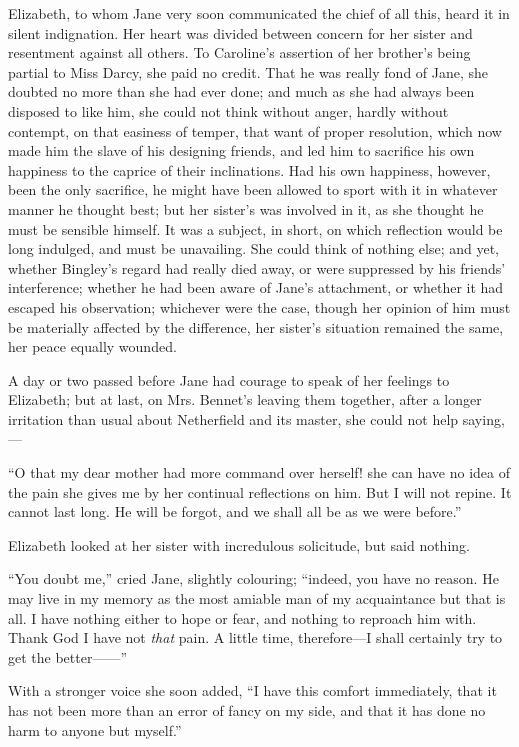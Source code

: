 Elizabeth, to whom Jane very soon communicated the chief of all this, heard it in silent indignation. Her heart was divided between concern for her sister and resentment against all others. To Caroline's assertion of her brother's being partial to Miss Darcy, she paid no credit. That he was really fond of Jane, she doubted no more than she had ever done; and much as she had always been disposed to like him, she could not think without anger, hardly without contempt, on that easiness of temper, that want of proper resolution, which now made him the slave of his designing friends, and led him to sacrifice his own happiness to the caprice of their inclinations. Had his own happiness, however, been the only sacrifice, he might have been allowed to sport with it in whatever manner he thought best; but her sister's was involved in it, as she thought he must be sensible himself. It was a subject, in short, on which reflection would be long indulged, and must be unavailing. She could think of nothing else; and yet, whether Bingley's regard had really died away, or were suppressed by his friends' interference; whether he had been aware of Jane's attachment, or whether it had escaped his observation; whichever were the case, though her opinion of him must be materially affected by the difference, her sister's situation remained the same, her peace equally wounded.

A day or two passed before Jane had courage to speak of her feelings to Elizabeth; but at last, on Mrs. Bennet's leaving them together, after a longer irritation than usual about Netherfield and its master, she could not help saying,---

``O that my dear mother had more command over herself! she can have no idea of the pain she gives me by her continual reflections on him. But I will not repine. It cannot last long. He will be forgot, and we shall all be as we were before.''

Elizabeth looked at her sister with incredulous solicitude, but said nothing.

``You doubt me,'' cried Jane, slightly colouring; ``indeed, you have no reason. He may live in my memory as the most amiable man of my acquaintance but that is all. I have nothing either to hope or fear, and nothing to reproach him with. Thank God I have not \textit{that} pain. A little time, therefore---I shall certainly try to get the better------''

With a stronger voice she soon added, ``I have this comfort immediately, that it has not been more than an error of fancy on my side, and that it has done no harm to anyone but myself.''

